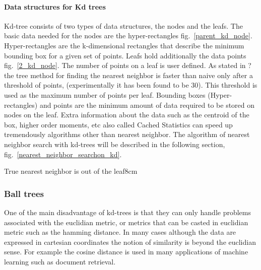 \documentclass[12pt,letterpaper,doublespaced,ETD,dvips,proposal]{gtthesis}
\begin{document}
\begin{Body}
\paragraph{Data structures for Kd trees}

 Kd-tree consists of two types of data structures, the nodes and the
 leafs. The basic data needed for the nodes are the
 hyper-rectangles fig.~\ref{parent_kd_node}. Hyper-rectangles are the k-dimensional rectangles
 that describe the minimum bounding box  for a given set of points.
 Leafs hold additionally the data points  fig.~\ref{2_kd_node}. The number of points on a
 leaf is user defined. As stated in ? the tree method for finding the nearest neighbor is faster than naive
 only after a threshold of points, (experimentally it has been found
 to be 30). This threshold is used as the maximum number of points
 per leaf. Bounding boxes (Hyper-rectangles) and points are the minimum amount
 of data required to be stored on nodes on the leaf. Extra
 information about the data such as the centroid of the box, higher
 order moments, etc also called Cached Statistics can speed up
 tremendously algorithms other than nearest neighbor. The algorithm
 of nearest neighbor search with kd-trees will be described  in the following section,
 fig.~\ref{nearest_neighbor_searchon_kd}.





{True nearest neighbor is out of the leaf}{8cm}






\subsubsection{Ball trees}
One of the main disadvantage of kd-trees is that they can only
handle problems associated with the euclidian metric, or metrics
that can be casted in euclidian metric such as the hamming distance.
In many cases although the data are expressed in cartesian
coordinates the notion of similarity is beyond the euclidian sense.
For example the cosine distance is used in many applications of
machine learning such as document retrieval.


\end{Body}
\end{document}
